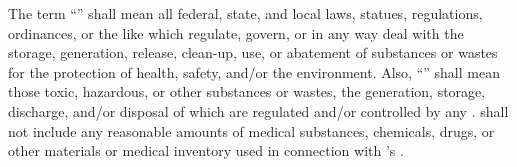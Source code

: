 The term ``'' shall mean all federal, state, and local laws, statues, regulations, ordinances, or the like which regulate, govern, or in any way deal with the storage, generation, release, clean-up, use, or abatement of substances or wastes for the protection of health, safety, and/or the environment. Also, ``'' shall mean those toxic, hazardous, or other substances or wastes, the generation, storage, discharge, and/or disposal of which are regulated and/or controlled by any \environmentalLaws. \hazardousSubstances shall not include any reasonable amounts of medical substances, chemicals, drugs, or other materials or medical inventory used in connection with \lessee's \permittedUse.
